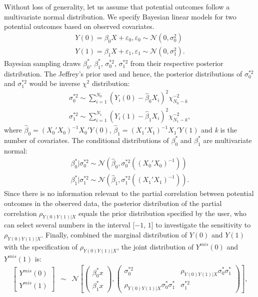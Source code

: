 	Without loss of generality, let us assume that potential outcomes follow a multivariate normal distribution. We specify Bayesian linear models for two potential outcomes based on observed covariates. 
	\begin{align}
		Y(0) = \beta_{0}X + \varepsilon_{0}, \varepsilon_{0} \sim \mathcal{N}(0, \sigma_{0}^2)\\
		Y(1) = \beta_{1}X + \varepsilon_{1}, \varepsilon_{1} \sim \mathcal{N}(0, \sigma_{1}^2).
	\end{align}
	Bayesian sampling draws $\beta_{0}^{*}$, $\beta_{1}^{*}$, $\sigma_{0}^{*2}$, $\sigma_{1}^{*2}$ from their respective posterior distribution. The Jeffrey's prior used and hence, the posterior distributions of $\sigma_{0}^{*2}$ and $\sigma_{1}^{*2}$ would be inverse $\chi^2$ distribution:
	\begin{align}
		\sigma_{0}^{*2} \sim \sum_{i = 1}^{N_{0}}(Y_i(0) - \hat{\beta}_{0}X_{i})^2\chi_{N_{0} - k}^{-2}\\
		\sigma_{1}^{*2} \sim \sum_{i = 1}^{N_{1}}(Y_i(1) - \hat{\beta}_{1}X_{i})^2\chi_{N_{1} - k}^{-2},
	\end{align}
	where $\hat{\beta}_{0} = (X_{0}'X_{0})^{-1}X_{0}'Y(0)$, $\hat{\beta}_{1} = (X_{1}'X_{1})^{-1}X_{1}'Y(1)$ and \emph{k} is the number of covariates. The conditional distributions of  $\beta_{0}^{*}$ and $\beta_{1}^{*}$ are multivariate normal:
	\begin{align}
		\beta_{0}^{*} | \sigma_{0}^{*2} \sim \mathcal{N}(\hat{\beta}_{0}, \sigma_{0}^{*2}((X_{0}'X_{0})^{-1}))\\
		\beta_{1}^{*} | \sigma_{1}^{*2} \sim \mathcal{N}(\hat{\beta}_{1}, \sigma_{1}^{*2}((X_{1}'X_{1})^{-1})).
	\end{align}
	Since there is no information relevant to the partial correlation between potential outcomes in the observed data, the posterior distribution of the partial correlation $\rho_{Y(0)Y(1)|X}$ equals the prior distribution specified by the user, who can select several numbers in the interval [$-1$, $1$] to investigate the sensitivity to $\rho_{Y(0)Y(1)|X}$. 
	Finally, combined the marginal distribution of $Y(0)$ and $Y(1)$ with the specification of $\rho_{Y(0)Y(1)|X}$, the joint distribution of $Y^{mis}(0)$ and $Y^{mis}(1)$ is:
	\begin{eqnarray}
		\left[\begin{array}{c}
			Y^{mis}(0)\\
			Y^{mis}(1)
		\end{array}\right] & \sim & \mathcal{N}\left[\left(\begin{array}{c}
			\beta^{*}_{0}x\\
			\beta^{*}_{1}x
		\end{array}\right),\left(\begin{array}{cc}
			\sigma^{*2}_{0} & \rho_{Y(0)Y(1)|X}\sigma^{*}_{0}\sigma^{*}_{1}\\
			\rho_{Y(0)Y(1)|X}\sigma^{*}_{0}\sigma^{*}_{1} & \sigma^{*2}_{1}
		\end{array}\right)\right],
	\end{eqnarray}
